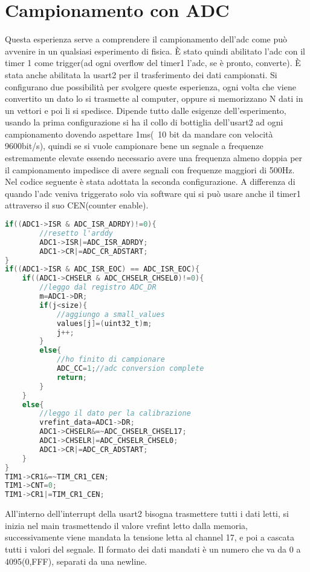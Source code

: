 \documentclass[main.tex]{subfiles}
\begin{document}
\section{Campionamento con ADC}
Questa esperienza serve a comprendere il campionamento dell'adc come può avvenire in un qualsiasi esperimento di fisica. È stato quindi abilitato l'adc con il timer 1 come trigger(ad ogni overflow del timer1 l'adc, se è pronto, converte). È stata anche abilitata la usart2 per il trasferimento dei dati campionati. 
Si configurano due possibilità per svolgere queste esperienza, ogni volta che viene convertito un dato lo si trasmette al computer, oppure si memorizzano N dati in un vettori e poi li si spedisce. 
Dipende tutto dalle esigenze dell'esperimento, usando la prima configurazione si ha il collo di bottiglia dell'usart2 ad ogni campionamento dovendo aspettare 1ms(~10 bit da mandare con velocità 9600bit/s), quindi se si vuole campionare bene un segnale a frequenze estremamente elevate essendo necessario avere una frequenza almeno doppia per il campionamento impedisce di avere segnali con frequenze maggiori di 500Hz. Nel codice seguente è stata adottata la seconda configurazione. 
A differenza di quando l'adc veniva triggerato solo via software qui si può usare anche il timer1 attraverso il suo CEN(counter enable). 
\begin{lstlisting}[caption=Interrupt ADC, language=C]
if((ADC1->ISR & ADC_ISR_ADRDY)!=0){
        //resetto l'arddy
        ADC1->ISR|=ADC_ISR_ADRDY;
        ADC1->CR|=ADC_CR_ADSTART;
}
if((ADC1->ISR & ADC_ISR_EOC) == ADC_ISR_EOC){
    if((ADC1->CHSELR & ADC_CHSELR_CHSEL0)!=0){
	    //leggo dal registro ADC_DR
        m=ADC1->DR;
        if(j<size){
            //aggiungo a small_values
            values[j]=(uint32_t)m;
            j++;
        }
        else{
            //ho finito di campionare
            ADC_CC=1;//adc conversion complete
            return;
        }
    }
    else{
        //leggo il dato per la calibrazione
        vrefint_data=ADC1->DR;
        ADC1->CHSELR&=~ADC_CHSELR_CHSEL17;
        ADC1->CHSELR|=ADC_CHSELR_CHSEL0;
        ADC1->CR|=ADC_CR_ADSTART;
    }
}
TIM1->CR1&=~TIM_CR1_CEN;
TIM1->CNT=0;
TIM1->CR1|=TIM_CR1_CEN;
\end{lstlisting}
All'interno dell'interrupt della usart2 bisogna trasmettere tutti i dati letti, si inizia nel main trasmettendo il valore vrefint letto dalla memoria, successivamente viene mandata la tensione letta al channel 17, e poi a cascata tutti i valori del segnale. Il formato dei dati mandati è un numero che va da 0 a 4095(0,FFF), separati da una newline. 
\end{document}
